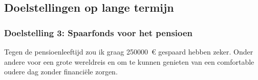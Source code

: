 \subsection{Doelstellingen op lange termijn}

\subsubsection{Doelstelling 3: Spaarfonds voor het pensioen}
Tegen de pensioenleeftijd zou ik graag 250000~\euro{} gespaard hebben zeker. Onder andere voor een grote wereldreis en om te kunnen genieten van een comfortable oudere dag zonder financiële zorgen.


